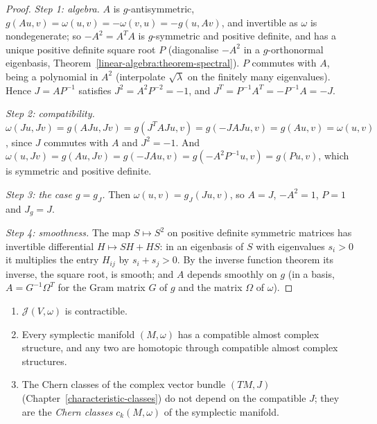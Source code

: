 \begin{proof}
\emph{Step 1: algebra.} $A$ is $g$-antisymmetric, $g(Au, v) = \omega(u, v) = -\omega(v, u) = -g(u, Av)$, and invertible as $\omega$ is nondegenerate; so $-A^2 = A^TA$ is $g$-symmetric and positive definite, and has a unique
positive definite square root $P$ (diagonalise $-A^2$ in a $g$-orthonormal eigenbasis, Theorem~\ref{linear-algebra:theorem-spectral}). $P$ commutes with $A$, being a polynomial in $A^2$ (interpolate
$\sqrt{\lambda}$ on the finitely many eigenvalues). Hence $J = AP^{-1}$ satisfies $J^2 = A^2P^{-2} = -1$, and $J^T = P^{-1}A^T = -P^{-1}A = -J$.

\emph{Step 2: compatibility.} $\omega(Ju, Jv) = g(AJu, Jv) = g(J^TAJu, v) = g(-JAJu, v) = g(Au, v) = \omega(u, v)$, since $J$ commutes with $A$ and $J^2 = -1$. And
$\omega(u, Jv) = g(Au, Jv) = g(-JAu, v) = g(-A^2P^{-1}u, v) = g(Pu, v)$, which is symmetric and positive definite.

\emph{Step 3: the case $g = g_J$.} Then $\omega(u, v) = g_J(Ju, v)$, so $A = J$, $-A^2 = 1$, $P = 1$ and $J_g = J$.

\emph{Step 4: smoothness.} The map $S \mapsto S^2$ on positive definite symmetric matrices has invertible differential $H \mapsto SH + HS$: in an eigenbasis of $S$ with eigenvalues $s_i > 0$ it multiplies the entry $H_{ij}$ by
$s_i + s_j > 0$. By the inverse function theorem its inverse, the square root, is smooth; and $A$ depends smoothly on $g$ (in a basis, $A = G^{-1}\Omega^T$ for the Gram matrix $G$ of $g$ and the matrix $\Omega$ of $\omega$).
\end{proof}

\begin{proposition}\label{symplectic-geometry:proposition-compatible-contractible}
\begin{enumerate}
\item $\mathcal{J}(V, \omega)$ is contractible.
\item Every symplectic manifold $(M, \omega)$ has a compatible almost complex structure, and any two are homotopic through compatible almost complex structures.
\item The Chern classes of the complex vector bundle $(TM, J)$ (Chapter~\ref{characteristic-classes}) do not depend on the compatible $J$; they are the \emph{Chern classes} $c_k(M, \omega)$ of the symplectic manifold.
\end{enumerate}
\end{proposition}

